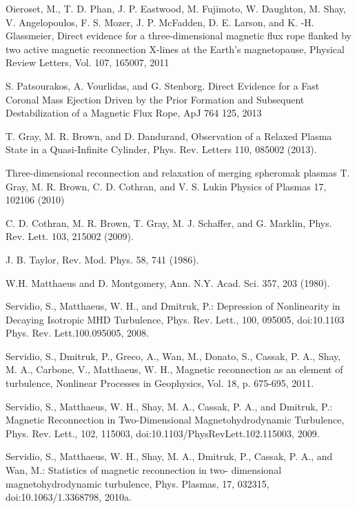 \documentclass[12pt]{iopart}
\begin{document}
\begin{thebibliography}{10}
Oieroset, M., T. D. Phan, J. P. Eastwood, M. Fujimoto, W. Daughton, M. Shay, V. Angelopoulos, F. S. Mozer, J. P. McFadden, D. E. Larson, and K. -H. Glassmeier, Direct evidence for a three-dimensional magnetic flux rope flanked by two active magnetic reconnection X-lines at the Earth's magnetopause, Physical Review Letters, Vol. 107, 165007, 2011

S. Patsourakos, A. Vourlidas, and G. Stenborg. Direct Evidence for a Fast Coronal Mass Ejection Driven by the Prior Formation and Subsequent Destabilization of a Magnetic Flux Rope,
ApJ 764 125, 2013

T. Gray, M. R. Brown, and D. Dandurand, Observation of a Relaxed Plasma State in a Quasi-Infinite Cylinder, Phys. Rev. Letters 110, 085002 (2013). 

Three-dimensional reconnection and relaxation of merging spheromak plasmas 
T. Gray, M. R. Brown, C. D. Cothran, and V. S. Lukin 
Physics of Plasmas 17, 102106 (2010)

C. D. Cothran, M. R. Brown, T. Gray, M. J. Schaffer, and
G. Marklin, Phys. Rev. Lett. 103, 215002 (2009).

 J. B. Taylor, Rev. Mod. Phys. 58, 741 (1986).

 W.H. Matthaeus and D. Montgomery, Ann. N.Y. Acad. Sci. 357, 203 (1980).

Servidio, S., Matthaeus, W. H., and Dmitruk, P.: Depression of Nonlinearity in Decaying Isotropic MHD Turbulence, Phys. Rev. Lett., 100, 095005, doi:10.1103 Phys. Rev. Lett.100.095005, 2008.

Servidio, S., Dmitruk, P., Greco, A., Wan, M., Donato, S., Cassak, P. A., Shay, M. A., Carbone, V., Matthaeus, W. H., Magnetic reconnection as an element of turbulence, Nonlinear Processes in Geophysics, Vol. 18, p. 675-695, 2011. 

Servidio, S., Matthaeus, W. H., Shay, M. A., Cassak, P. A., and Dmitruk, P.: Magnetic Reconnection in Two-Dimensional Magnetohydrodynamic Turbulence, Phys. Rev. Lett., 102, 115003, doi:10.1103/PhysRevLett.102.115003, 2009.

Servidio, S., Matthaeus, W. H., Shay, M. A., Dmitruk, P., Cassak, P. A., and Wan, M.: Statistics of magnetic reconnection in two- dimensional magnetohydrodynamic turbulence, Phys. Plasmas, 17, 032315, doi:10.1063/1.3368798, 2010a.


\end{thebibliography}
\end{document}
